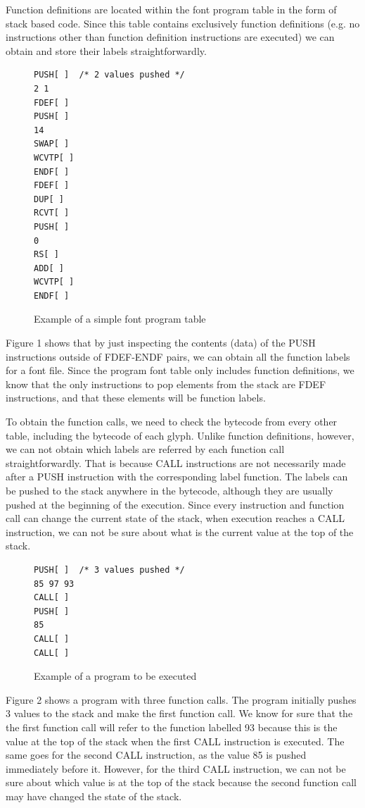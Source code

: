 \documentclass[12pt]{article}
\begin{document}
Function definitions are located within the font program table in the
form of stack based code. Since this table contains exclusively function
definitions (e.g. no instructions other than function definition
instructions are executed) we can obtain and store their labels
straightforwardly. 

\begin{figure}[ht!]
\begin{verbatim}
PUSH[ ]  /* 2 values pushed */
2 1
FDEF[ ]
PUSH[ ]
14
SWAP[ ]
WCVTP[ ]
ENDF[ ]
FDEF[ ]
DUP[ ]
RCVT[ ]
PUSH[ ]
0
RS[ ]
ADD[ ]
WCVTP[ ]
ENDF[ ]
\end{verbatim}
\caption{Example of a simple font program table}
\end{figure}

Figure 1 shows that by just inspecting the contents (data) of
the PUSH instructions outside of FDEF-ENDF pairs, we can obtain all the
function labels for a font file. Since the program font table only
includes function definitions, we know that the only instructions to pop
elements from the stack are FDEF instructions, and that these elements
will be function labels.

To obtain the function calls, we need to check the bytecode from every
other table, including the bytecode of each glyph. Unlike function
definitions, however, we can not obtain which labels are referred by each
function call straightforwardly. That is because CALL instructions
are not necessarily made after a PUSH instruction with the corresponding
label function. The labels can be pushed to the stack anywhere in the
bytecode, although they are usually pushed at the beginning of the
execution. Since every instruction and function call can change the
current state of the stack, when execution reaches a CALL instruction, we
can not be sure about what is the current value at the top of the stack. 

\begin{figure}[ht!]
\begin{verbatim}
PUSH[ ]  /* 3 values pushed */
85 97 93
CALL[ ]
PUSH[ ]
85
CALL[ ]
CALL[ ]
\end{verbatim}
\caption{Example of a program to be executed}
\end{figure}

Figure 2 shows a program with three function calls. The program
initially pushes 3 values to the stack and make the first function call.
We know for sure that the the first function call will refer to the
function labelled 93 because this is the value at the top of the stack
when the first CALL instruction is executed. The same goes for the
second CALL instruction, as the value 85 is pushed immediately before
it. However, for the third CALL instruction, we can not be sure about which
value is at the top of the stack because the second function call may have
changed the state of the stack.  
\end{document}
